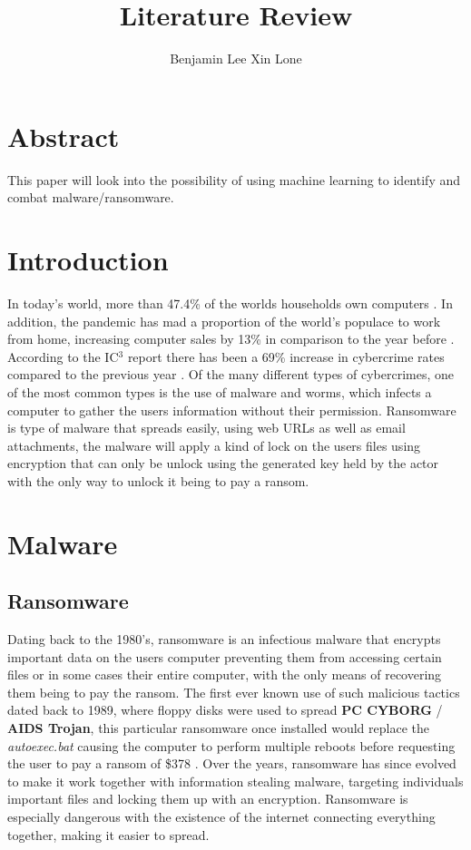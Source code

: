 \documentclass[progress]{cmpreport}
\title{Literature Review}
\author{Benjamin Lee Xin Lone}
\begin{document}
	\section{Abstract}
			This paper will look into the possibility of using machine learning to identify and combat malware/ransomware. 
			
	\section{Introduction}
			In today's world, more than 47.4\% of the worlds households own computers \citep{Alsop}. In addition, the pandemic has mad a proportion of the world's populace to work from home, increasing computer sales by 13\% in comparison to the year before \citep{page}. According to the IC$^3$ report there has been a 69\% increase in cybercrime rates compared to the previous year \citep{IC3}. Of the many different types of cybercrimes, one of the most common types is the use of malware and worms, which infects a computer to gather the users information without their permission. Ransomware is type of malware that spreads easily, using web URLs as well as email attachments, the malware will apply a kind of lock on the users files using encryption that can only be unlock using the generated key held by the actor with the only way to unlock it being to pay a ransom. 
			
	\section{Malware}
		\subsection{Ransomware}
			Dating back to the 1980's, ransomware is an infectious malware that encrypts important data on the users computer preventing them from accessing certain files or in some cases their entire computer, with the only means of recovering them being to pay the ransom. The first ever known use of such malicious tactics dated back to 1989, where floppy disks were used to spread \textbf{PC CYBORG} / \textbf{AIDS Trojan}, this particular ransomware once installed would replace the \emph{autoexec.bat} causing the computer to perform multiple reboots before requesting the user to pay a ransom of \$378 \citep{NathGiri}. Over the years, ransomware has since evolved to make it work together with information stealing malware, targeting individuals important files and locking them up with an encryption. Ransomware is especially dangerous with the existence of the internet connecting everything together, making it easier to spread.
		
\end{document}
